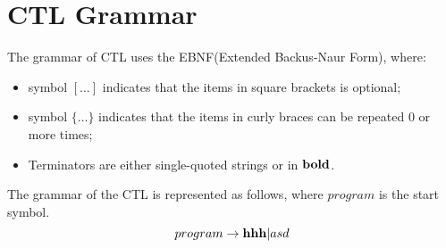 \chapter{CTL Grammar}
The grammar of CTL uses the EBNF(Extended Backus-Naur Form), where:
\begin{itemize}
    \item symbol $[\dots]$ indicates that the items in square brackets is optional;
    \item symbol $\{\dots\}$ indicates that the items in curly braces can be repeated 0 or more times;
    \item Terminators are either single-quoted strings or in $\mathbf{bold}$.
\end{itemize}
The grammar of the CTL is represented as follows, where $program$ is the start symbol.
$$
program \rightarrow \mathbf{hhh} | asd
$$
